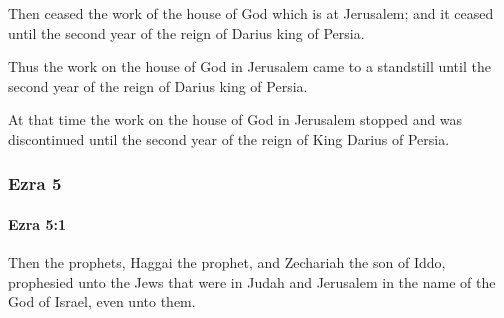 			\begin{versebox}
					\item[BHS] 
					\item[LXX] 
					\item[ASV] Then ceased the work of the house of God which is at Jerusalem; and it ceased until the second year of the reign of Darius king of Persia.
					\item[NIV] Thus the work on the house of God in Jerusalem came to a standstill until the second year of the reign of Darius king of Persia.
					\item[NRSV] At that time the work on the house of God in Jerusalem stopped and was discontinued until the second year of the reign of King Darius of Persia.
			\end{versebox}
	\subsubsection{Ezra 5} %
		\label{EZRA-5}

		\paragraph{Ezra 5:1} %
			\label{EZRA-5-1}

			Then the prophets, Haggai the prophet, and Zechariah the son of Iddo, prophesied unto the Jews that were in Judah and Jerusalem in the name of the God of Israel, even unto them.

